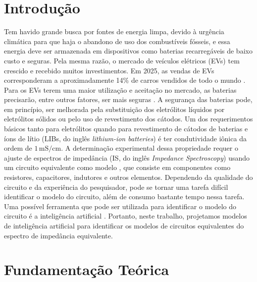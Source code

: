 
\chapter{Introdução}
Tem havido grande busca por fontes de energia limpa, devido à urgência climática
para que haja o abandono de uso dos combustíveis fósseis, e essa energia deve ser armazenada
em dispositivos como baterias recarregáveis de baixo custo e seguras. Pela mesma razão, o mercado
de veículos elétricos (EVs) tem crescido e recebido muitos investimentos. Em 2025, as vendas
de EVs corresponderam a aproximadamente 14\% de carros vendidos de todo o mundo \cite{IEA2026}. Para os EVs terem
uma maior utilização e aceitação no mercado, as baterias precisarão, entre outros fatores, ser
mais seguras \cite{olivetti2017lithium,armand2008building}. A segurança das baterias pode, em princípio, ser melhorada pela
substituição dos eletrólitos líquidos por eletrólitos sólidos ou pelo uso de revestimento dos
cátodos. Um dos requerimentos básicos tanto para eletrólitos quando para revestimento de cátodos
de baterias e íons de lítio (LIBs, do inglês \textit{lithium-ion batteries}) é ter condutividade iônica da ordem
de $1\,\mathrm{mS/cm}$. A determinação experimental dessa propriedade requer o ajuste de espectros de
impedância (IS, do inglês \textit{Impedance Spectroscopy}) usando um circuito equivalente como modelo \cite{sinfronio2018effect,santos2018chitosan}, que
consiste em componentes como resistores, capacitores, indutores e outros elementos.
Dependendo da qualidade do circuito e da experiência do pesquisador, pode se tornar uma
tarefa difícil identificar o modelo do circuito, além de consumo bastante tempo nessa
tarefa. Uma possível ferramenta que pode ser utilizada para identificar o modelo do circuito é a inteligência artificial \cite{zhu2019equivalent,huang2021towards,obregon2023convolutional,buteau2019analysis}. Portanto, neste trabalho, projetamos modelos
de inteligência artificial para identificar os modelos de circuitos equivalentes do espectro de
impedância equivalente.

\pagebreak

\chapter{Fundamentação Teórica}

